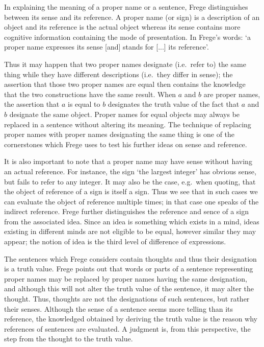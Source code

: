 \documentclass{article}
\begin{document}
\maketitle

In explaining the meaning of a proper name or a sentence, Frege distinguishes between its sense and its reference. A proper name (or sign) is a description of an object and its reference is the actual object whereas its sense contains more cognitive information containing the mode of presentation. In Frege's words: `a proper name expresses its sense [and] stands for [...] its reference'. 

Thus it may happen that two proper names designate (i.e.~refer to) the same thing while they have different descriptions (i.e.~they differ in sense); the assertion that those two proper names are equal then contains the knowledge that the two constructions have the same result. When $a$ and $b$ are proper names, the assertion that $a$ is equal to $b$ designates the truth value of the fact that $a$ and $b$ designate the same object. Proper names for equal objects may always be replaced in a sentence without altering its meaning. The technique of replacing proper names with proper names designating the same thing is one of the cornerstones which Frege uses to test his further ideas on sense and reference. 

It is also important to note that a proper name may have sense without having an actual reference. For instance, the sign `the largest integer' has obvious sense, but fails to refer to any integer. It may also be the case, e.g.~when quoting, that the object of reference of a sign is itself a sign. Thus we see that in such cases we can evaluate the object of reference multiple times; in that case one speaks of the indirect reference. Frege further distinguishes the reference and sence of a sign from the associated idea. Since an idea is something which exists in a mind, ideas existing in different minds are not eligible to be equal, however similar they may appear; the notion of idea is the third level of difference of expressions.

The sentences which Frege considers contain thoughts and thus their designation is a truth value. Frege points out that words or parts of a sentence representing proper names may be replaced by proper names having the same designation, and although this will not alter the truth value of the sentence, it may alter the thought. Thus, thoughts are not the designations of such sentences, but rather their senses. Although the sense of a sentence seems more telling than its reference, the knowledged obtained by deriving the truth value is the reason why references of sentences are evaluated. A judgment is, from this perspective, the step from the thought to the truth value. 
\end{document}
